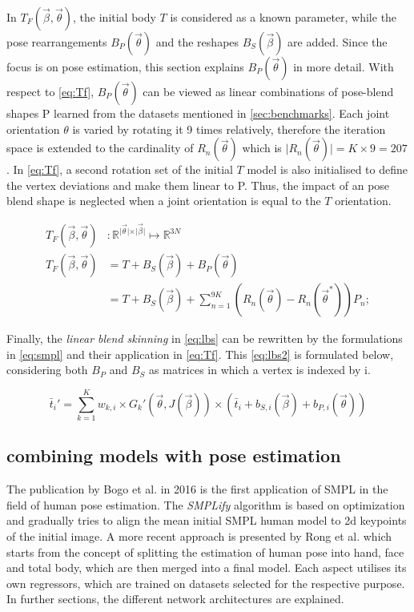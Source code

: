In $T_{F}(\vec{\beta},\vec{\theta})$, the initial body $T$ is considered as a known parameter, while the pose rearrangements $B_{P}(\vec{\theta})$ and the reshapes $B_{S}(\vec{\beta})$ are added. Since the focus is on pose estimation, this section explains $B_{P}(\vec{\theta})$ in more detail. With respect to \autoref{eq:Tf}, $B_{P}(\vec{\theta})$ can be viewed as linear combinations of pose-blend shapes P learned from the datasets mentioned in \autoref{sec:benchmarks}. Each joint orientation $\theta$ is varied by rotating it 9 times relatively, therefore the iteration space is extended to the cardinality of $R_{n}(\vec{\theta})$ which is $\vert R_{n}(\vec{\theta}) \vert = K \times 9 = 207$. In \autoref{eq:Tf}, a second rotation set of the initial $T$ model is also initialised to define the vertex deviations and make them linear to P. Thus, the impact of an pose blend shape is neglected when a joint orientation is equal to the $T$ orientation.

\begin{equation}
\label{eq:Tf}
	\begin{split}
		T_{F}(\vec{\beta},\vec{\theta})&: \mathbb{R}^{\vert \vec{\theta} 			\vert \times \vert \vec{\beta} \vert} \mapsto \mathbb{R}^{3N} \\
		T_{F}(\vec{\beta},\vec{\theta}) &= T + B_{S}(\vec{\beta}) + B_{P}				(\vec{\theta}) \\
		&= T + B_{S}(\vec{\beta}) + \sum_{n=1}^{9K} (R_{n}(\vec{\theta}) - 				R_{n}(\vec{\theta}^{*}))P_{n};
	\end{split}
\end{equation}

Finally, the \emph{linear blend skinning} in \autoref{eq:lbs} can be rewritten by the formulations in \autoref{eq:smpl} and their application in \autoref{eq:Tf}. This \autoref{eq:lbs2} is formulated below, considering both $B_{P}$ and $B_{S}$ as matrices in which a vertex is indexed by i. \cite{smpl}

\begin{equation}
\label{eq:lbs2}
\bar{t}_{i}' = \sum_{k=1}^{K} w_{k,i} \times G_{k}'(\vec{\theta},J(\vec{\beta})) \times (\bar{t}_{i} + b_{S,i}(\vec{\beta}) +b_{P,i}(\vec{\theta}))
\end{equation}

\subsection{combining models with pose estimation}
The publication by Bogo et al. \cite{simplify} in 2016 is the first application of SMPL in the field of human pose estimation. The \emph{SMPLify} algorithm is based on optimization and gradually tries to align the mean initial SMPL human model to 2d keypoints of the initial image. A more recent approach is presented by Rong et al. \cite{frankmocap} which starts from the concept of splitting the estimation of human pose into hand, face and total body, which are then merged into a final model. Each aspect utilises its own regressors, which are trained on datasets selected for the respective purpose. In further sections, the different network architectures are explained.

